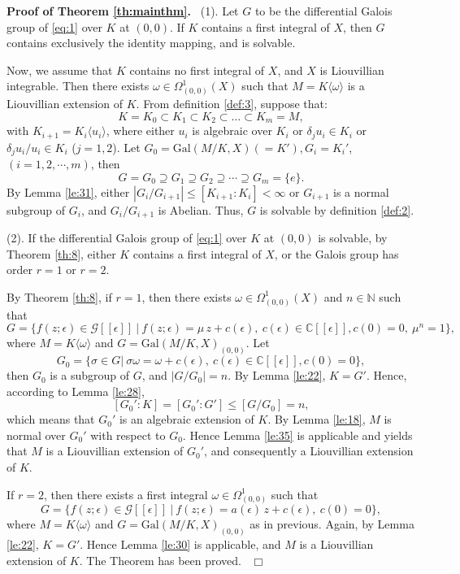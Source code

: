 \documentclass[preprint, 12pt]{elsarticle}
\numberwithin{equation}{section}
\newenvironment{proof}[1][Proof]{\textbf{#1.}\ }{\ $\Box$}
\newcommand{\Comp}{\mathbb{C}}
\newcommand{\G}{\mathcal{G}}
\newcommand{\Gal}{\mathrm{Gal}}
\begin{document}
\begin{proof}[Proof of Theorem \ref{th:mainthm}]
(1). Let $G$ to be the differential Galois group of \eqref{eq:1} over $K$ at $(0,0)$. If $K$ contains a first integral of $X$, then $G$ contains
exclusively the identity mapping, and is solvable.

Now, we assume that $K$ contains no first integral of $X$, and $X$
is Liouvillian integrable. Then there exists $\omega\in
\Omega_{(0,0)}^1(X)$ such that $M = K\langle \omega\rangle $ is a
Liouvillian extension of $K$. From definition \ref{def:3},
suppose that:
$$K = K_0\subset K_1\subset K_2\subset \dots\subset K_m = M,$$
with $K_{i+1} = K_i\langle u_i\rangle $, where either $u_i$ is
algebraic over $K_i$ or $\delta_j u_i\in K_i$ or $\delta_j
u_i/u_i\in K_i$ ($j = 1,2$). Let $G_0 = \Gal(M/K,X) ( = K'), G_i =
K_i'$, $(i = 1,2,\cdots,m)$, then
$$G = G_0\supseteq G_1 \supseteq G_2\supseteq\cdots\supseteq G_m = \{e\}.$$
By Lemma \ref{le:31}, either $|G_i/G_{i+1}|\leq[K_{i+1}:K_i] <
\infty$ or $G_{i+1}$ is a normal subgroup of $G_i$, and
$G_i/G_{i+1}$ is Abelian. Thus, $G$ is solvable by definition \ref{def:2}.

 (2). If the differential Galois group of \eqref{eq:1} over $K$ at $(0,0)$ is solvable,
by Theorem \ref{th:8}, either $K$ contains a first integral of $X$,
or the Galois group has order $r = 1$ or $r = 2$.

By Theorem \ref{th:8}, if $r = 1$, then there exists $\omega\in
\Omega_{(0,0)}^1(X)$ and $n\in \mathbb{N}$ such that
$$G = \{f(z;\epsilon)\in \G[[\epsilon]]\ |\ f(z;\epsilon) = \mu\, z + c(\epsilon), \ c(\epsilon)\in \Comp[[\epsilon]], c(0) = 0,\ \mu^n = 1\},$$
where $M = K\langle\omega\rangle$ and $G = \Gal(M/K,X)_{(0,0)}$.
Let 
$$G_0 = \{\sigma\in G|\ \sigma\omega = \omega + c(\epsilon),\  c(\epsilon)\in \Comp[[\epsilon]], c(0) = 0\},$$
then $G_0$ is a subgroup of $G$, and $|G/G_0| = n$. By Lemma
\ref{le:22}, $K = G'$. Hence, according to Lemma \ref{le:28},
$$[G_0':K] = [G_0':G']\leq [G/G_0] = n,$$
which means that $G_0'$ is an algebraic extension of $K$. By Lemma
\ref{le:18}, $M$ is normal over $G_0'$ with respect to $G_0$.
Hence Lemma \ref{le:35} is applicable and yields that $M$ is a
Liouvillian extension of $G_0'$, and consequently a Liouvillian
extension of $K$.

If $r= 2$, then there exists a first integral $\omega\in
\Omega_{(0,0)}^1$ such that
 $$G  = \{f(z;\epsilon)\in \G[[\epsilon]]\ |\ f(z;\epsilon) = a(\epsilon)\, z + c(\epsilon),\ c(0) = 0\},$$
where $M = K\langle \omega \rangle$ and $G = \Gal(M/K,X)_{(0,0)}$ as in previous. Again, by Lemma \ref{le:22}, $K = G'$. Hence Lemma \ref{le:30} is
applicable, and $M$ is a Liouvillian extension of $K$. The Theorem
has been proved.
\end{proof}
\end{document}
